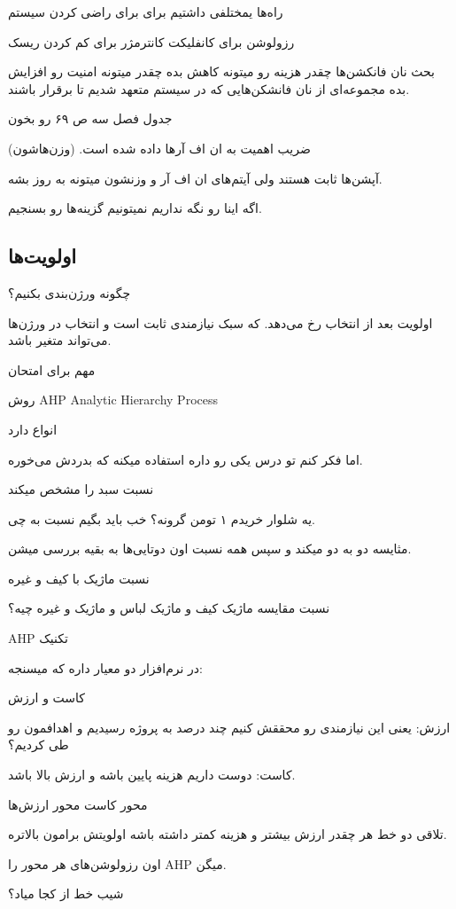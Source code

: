 راه‌ها یمختلفی داشتیم برای برای راضی کردن سیستم

رزولوشن برای کانفلیکت
کانترمژر برای کم کردن ریسک

بحث نان فانکشن‌ها
چقدر هزینه رو میتونه کاهش بده
چقدر میتونه امنیت رو افزایش بده مجموعه‌ای از نان فانشکن‌هایی که در سیستم متعهد
شدیم تا برقرار باشند.

جدول فصل سه ص ۶۹ رو بخون

ضریب اهمیت به ان اف آر‌ها داده شده است. (وزن‌هاشون)

آپشن‌ها ثابت هستند
ولی آیتم‌های ان اف آر و وزنشون میتونه به روز بشه.

اگه اینا رو نگه نداریم نمیتونیم گزینه‌ها رو بسنجیم.

\subsection{اولویت‌ها}

چگونه ورژن‌بندی بکنیم؟

اولویت بعد از انتخاب رخ می‌دهد.
که سبک نیازمندی ثابت است و انتخاب در ورژن‌ها می‌تواند متغیر باشد.

مهم برای امتحان

روش AHP Analytic Hierarchy Process

انواع دارد

اما فکر کنم تو درس یکی رو داره استفاده میکنه که بدردش می‌خوره.

نسبت سبد را مشخص میکند

یه شلوار خریدم ۱ تومن گرونه؟ خب باید بگیم نسبت به چی.

مثایسه دو به دو میکند و سپس همه نسبت اون دوتایی‌ها به بقیه بررسی میشن.

نسبت ماژیک با کیف و غیره

نسبت مقایسه ماژیک کیف و ماژیک لباس و ماژیک و غیره چیه؟

AHP تکنیک

در نرم‌افزار دو معیار داره که میسنجه:

کاست و ارزش

ارزش: یعنی این نیازمندی رو محققش کنیم چند درصد به پروژه رسیدیم و اهدافمون رو طی
کردیم؟

کاست: دوست داریم هزینه پایین باشه و ارزش بالا باشد.

محور کاست 
محور ارزش‌ها

تلاقی دو خط هر چقدر ارزش بیشتر و هزینه کمتر داشته باشه اولویتش برامون بالاتره.

اون رزولوشن‌های هر محور را AHP میگن.

شیب خط از کجا میاد؟

